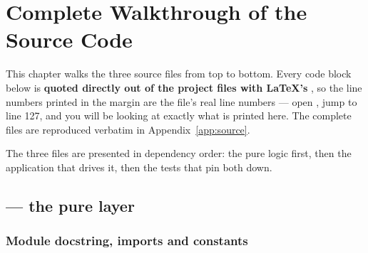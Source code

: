 \chapter{Complete Walkthrough of the Source Code}
\label{ch:source}

This chapter walks the three source files from top to bottom. Every code block below is
\textbf{quoted directly out of the project files with \LaTeX{}'s }, so the line
numbers printed in the margin are the file's real line numbers --- open , jump to
line 127, and you will be looking at exactly what is printed here. The complete files are reproduced
verbatim in Appendix~\ref{app:source}.

The three files are presented in dependency order: the pure logic first, then the application that
drives it, then the tests that pin both down.

\section{ --- the pure layer}
\label{sec:src-logic}

\subsection{Module docstring, imports and constants}

\begin{codecard}

\end{codecard}

